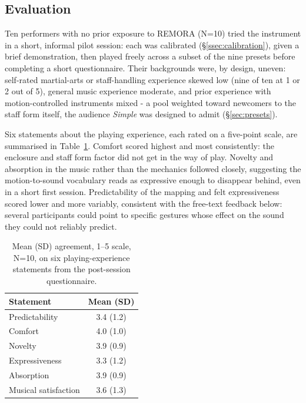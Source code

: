 \documentclass[a4paper,10pt,oneside]{article}
\newcommand{\preset}[1]{\textit{#1}}
\begin{document}
\begin{sloppy}
\section{Evaluation}
\label{sec:evaluation}

Ten performers with no prior exposure to REMORA (N=10) tried the instrument in a short,
informal pilot session: each was calibrated (\S\ref{ssec:calibration}), given a brief
demonstration, then played freely across a subset of the nine presets before completing
a short questionnaire. Their backgrounds were, by design, uneven: self-rated
martial-arts or staff-handling experience skewed low (nine of ten at 1 or 2 out of 5),
general music experience moderate, and prior experience with motion-controlled
instruments mixed - a pool weighted toward newcomers to the staff form itself, the
audience \preset{Simple} was designed to admit (\S\ref{sec:presets}).

Six statements about the playing experience, each rated on a five-point scale, are
summarised in Table~\ref{tab:eval}. Comfort scored highest and most consistently: the
enclosure and staff form factor did not get in the way of play. Novelty and absorption in
the music rather than the mechanics followed closely, suggesting the
motion-to-sound vocabulary reads as expressive enough to disappear behind, even in a
short first session. Predictability of the mapping and felt expressiveness scored lower
and more variably, consistent with the free-text feedback below: several participants
could point to specific gestures whose effect on the sound they could not reliably
predict.

\begin{table}[H]
\centering
\small
\begin{tabular}{@{}lc@{}}
\toprule
Statement & Mean (SD) \\
\midrule
Predictability & 3.4 (1.2) \\
Comfort & 4.0 (1.0) \\
Novelty & 3.9 (0.9) \\
Expressiveness & 3.3 (1.2) \\
Absorption & 3.9 (0.9) \\
Musical satisfaction & 3.6 (1.3) \\
\bottomrule
\end{tabular}
\caption{Mean (SD) agreement, 1--5 scale, N=10, on six playing-experience statements from
the post-session questionnaire.}
\label{tab:eval}
\end{table}
\FloatBarrier


\end{sloppy}
\end{document}

